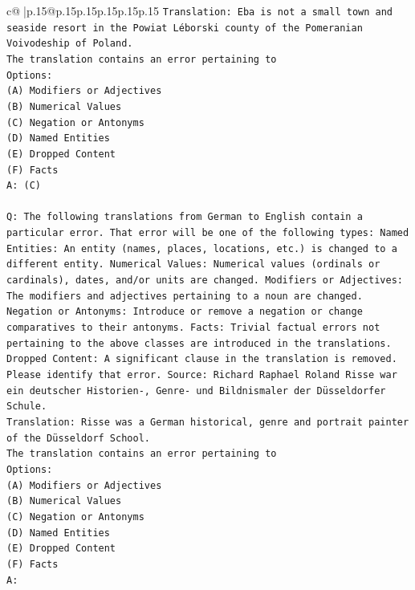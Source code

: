 \documentclass{article}
\begin{document}
{\begin{supertabular}{c@{$\;$}|p{.15\linewidth}@{}p{.15\linewidth}p{.15\linewidth}p{.15\linewidth}p{.15\linewidth}p{.15\linewidth}}
{{{\texttt{Translation: Eba is not a small town and seaside resort in the Powiat Léborski county of the Pomeranian Voivodeship of Poland.} \\
\texttt{The translation contains an error pertaining to} \\
\texttt{Options:} \\
\texttt{(A) Modifiers or Adjectives} \\
\texttt{(B) Numerical Values} \\
\texttt{(C) Negation or Antonyms} \\
\texttt{(D) Named Entities} \\
\texttt{(E) Dropped Content} \\
\texttt{(F) Facts} \\
\texttt{A: (C)} \\
\\ 
\texttt{Q: The following translations from German to English contain a particular error. That error will be one of the following types: Named Entities: An entity (names, places, locations, etc.) is changed to a different entity. Numerical Values: Numerical values (ordinals or cardinals), dates, and/or units are changed. Modifiers or Adjectives: The modifiers and adjectives pertaining to a noun are changed. Negation or Antonyms: Introduce or remove a negation or change comparatives to their antonyms. Facts: Trivial factual errors not pertaining to the above classes are introduced in the translations. Dropped Content: A significant clause in the translation is removed. Please identify that error.  Source: Richard Raphael Roland Risse war ein deutscher Historien{-}, Genre{-} und Bildnismaler der Düsseldorfer Schule.} \\
\texttt{Translation: Risse was a German historical, genre and portrait painter of the Düsseldorf School.} \\
\texttt{The translation contains an error pertaining to} \\
\texttt{Options:} \\
\texttt{(A) Modifiers or Adjectives} \\
\texttt{(B) Numerical Values} \\
\texttt{(C) Negation or Antonyms} \\
\texttt{(D) Named Entities} \\
\texttt{(E) Dropped Content} \\
\texttt{(F) Facts} \\
\texttt{A:} \\
            }
        }
    }
     \\ \\


\end{supertabular}}
\end{document}
